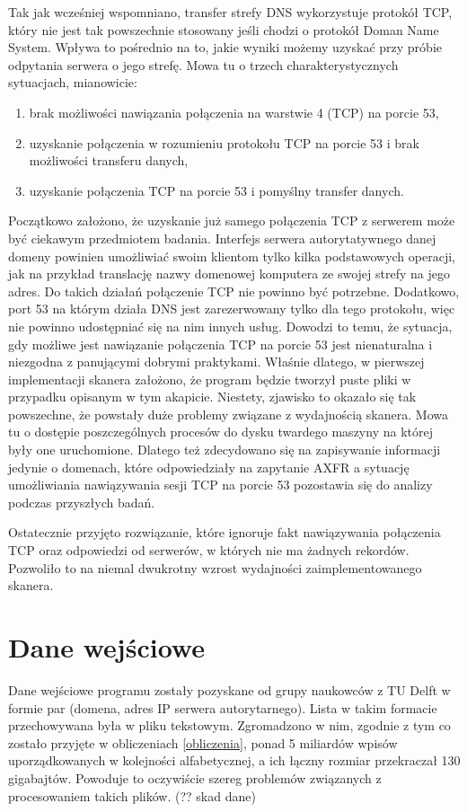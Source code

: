 Tak jak wcześniej wspomniano, transfer strefy DNS wykorzystuje protokół TCP, który nie jest tak powszechnie stosowany jeśli chodzi
o protokół Doman Name System. Wpływa to pośrednio na to, jakie wyniki możemy uzyskać przy próbie odpytania serwera o jego strefę. Mowa tu o
trzech charakterystycznych sytuacjach, mianowicie:
\begin{enumerate}
	\item brak możliwości nawiązania połączenia na warstwie 4 (TCP) na porcie 53,
	\item uzyskanie połączenia w rozumieniu protokołu TCP na porcie 53 i brak możliwości transferu danych,
	\item uzyskanie połączenia TCP na porcie 53 i pomyślny transfer danych.
\end{enumerate}

Początkowo założono, że uzyskanie już samego połączenia TCP z serwerem może być ciekawym przedmiotem badania. Interfejs serwera
autorytatywnego danej domeny powinien umożliwiać swoim klientom tylko kilka podstawowych operacji, jak na przykład translację nazwy
domenowej komputera ze swojej strefy na jego adres. Do takich działań połączenie TCP nie powinno być potrzebne. Dodatkowo, port 53 na którym działa
DNS jest zarezerwowany tylko dla tego protokołu, więc nie powinno udostępniać się na nim innych usług. Dowodzi to temu, że sytuacja,
gdy możliwe jest nawiązanie połączenia TCP na porcie 53 jest nienaturalna i niezgodna z panującymi dobrymi praktykami. Właśnie dlatego,
w pierwszej implementacji skanera założono, że program będzie tworzył puste pliki w przypadku opisanym w tym akapicie. Niestety,
zjawisko to okazało się tak powszechne, że powstały duże problemy związane z wydajnością skanera. Mowa tu o dostępie poszczególnych
procesów do dysku twardego maszyny na której były one uruchomione. Dlatego też zdecydowano się na zapisywanie informacji jedynie o
domenach, które odpowiedziały na zapytanie AXFR a sytuację umożliwiania nawiązywania sesji TCP na porcie 53 pozostawia się do analizy
podczas przyszłych badań.

Ostatecznie przyjęto rozwiązanie, które ignoruje fakt nawiązywania połączenia TCP oraz odpowiedzi od serwerów, w których nie ma
żadnych rekordów. Pozwoliło to na niemal dwukrotny wzrost wydajności zaimplementowanego skanera.

\section{Dane wejściowe}
\label{inputData}
Dane wejściowe programu zostały pozyskane od grupy naukowców z TU Delft \cite{delft} w formie par (domena, adres IP serwera
autorytarnego). Lista w takim formacie przechowywana była w pliku tekstowym. Zgromadzono w nim, zgodnie z tym co zostało przyjęte
w obliczeniach \ref{obliczenia}, ponad 5 miliardów wpisów uporządkowanych w kolejności alfabetycznej, a ich łączny rozmiar przekraczał
130 gigabajtów. Powoduje to oczywiście szereg problemów związanych z procesowaniem takich plików. (?? skad dane)

